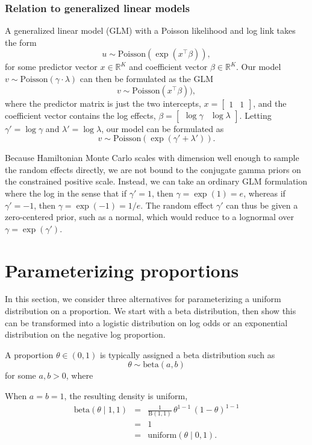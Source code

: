 \documentclass[11pt]{report}
\begin{document}
\subsubsection{Relation to generalized linear models}

A generalized linear model (GLM) with a Poisson likelihood and log
link takes the form
\[
  u \sim \textrm{Poisson}(\exp(x^{\top} \beta)),
\]
for some predictor vector $x \in \mathbb{R}^K$ and coefficient vector
$\beta \in \mathbb{R}^K$.  Our model $v \sim \textrm{Poisson}(\gamma
\cdot \lambda)$ can then be formulated as the GLM
\[
  v \sim \textrm{Poisson}(x^{\top} \beta)),
\]
where the predictor matrix is just the two intercepts, $x =
\begin{bmatrix} 1 & 1 \end{bmatrix}$, and the coefficient vector
contains the log effects, $\beta = \begin{bmatrix} \log \gamma & \log
  \lambda \end{bmatrix}$.  Letting $\gamma' = \log \gamma$ and
$\lambda' = \log \lambda$, our model can be formulated as
\[
  v \sim \textrm{Poisson}(\exp(\gamma' + \lambda')).
\]

Because Hamiltonian Monte Carlo scales with dimension well enough to
sample the random effects directly, we are not bound to the conjugate
gamma priors on the constrained positive scale. Instead, we can take
an ordinary GLM formulation where the log in the sense that if
$\gamma' = 1$, then $\gamma = \exp(1) = e$, whereas if $\gamma' = -1$,
then $\gamma = \exp(-1) = 1 / e$. The random effect $\gamma'$ can thus
be given a zero-centered prior, such as a normal, which would reduce
to a lognormal over $\gamma = \exp(\gamma')$.


\section{Parameterizing proportions}

In this section, we consider three alternatives for parameterizing a
uniform distribution on a proportion. We start with a beta
distribution, then show this can be transformed into a logistic
distribution on log odds or an exponential distribution on the
negative log proportion.

A proportion $\theta \in (0, 1)$ is typically assigned a beta
distribution such as
\[
  \theta \sim \textrm{beta}(a, b)
\]
for some $a, b > 0$, where


When $a = b = 1$, the resulting density is uniform,
\begin{eqnarray*}
  \textrm{beta}(\theta \mid 1, 1)
  & = & \frac{1}{\textrm{B}(1, 1)}
        \, \theta^{1 - 1}
        \, (1 - \theta)^{1 - 1}
  \\[2pt]
  & = & 1
  \\
  & = & \textrm{uniform}(\theta \mid 0, 1).
\end{eqnarray*}
\end{document}
